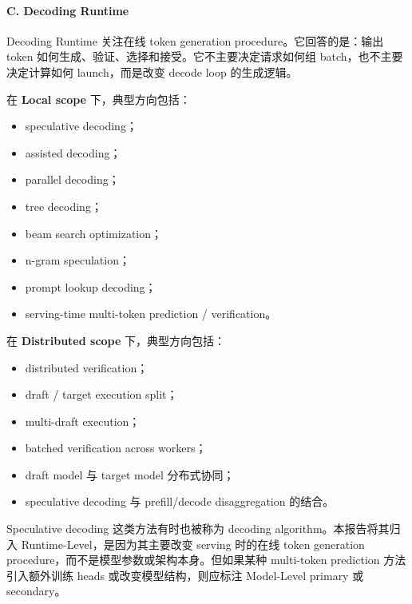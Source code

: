 \documentclass[a4paper,10pt]{ctexart}
\begin{document}
\paragraph*{C. Decoding Runtime}

Decoding Runtime 关注在线 token generation procedure。它回答的是：输出 token 如何生成、验证、选择和接受。它不主要决定请求如何组 batch，也不主要决定计算如何 launch，而是改变 decode loop 的生成逻辑。


在 \textbf{Local scope} 下，典型方向包括：


\begin{itemize}
\item speculative decoding；

\item assisted decoding；

\item parallel decoding；

\item tree decoding；

\item beam search optimization；

\item n-gram speculation；

\item prompt lookup decoding；

\item serving-time multi-token prediction / verification。

\end{itemize}
在 \textbf{Distributed scope} 下，典型方向包括：


\begin{itemize}
\item distributed verification；

\item draft / target execution split；

\item multi-draft execution；

\item batched verification across workers；

\item draft model 与 target model 分布式协同；

\item speculative decoding 与 prefill/decode disaggregation 的结合。

\end{itemize}
Speculative decoding 这类方法有时也被称为 decoding algorithm。本报告将其归入 Runtime-Level，是因为其主要改变 serving 时的在线 token generation procedure，而不是模型参数或架构本身。但如果某种 multi-token prediction 方法引入额外训练 heads 或改变模型结构，则应标注 Model-Level primary 或 secondary。
\end{document}
